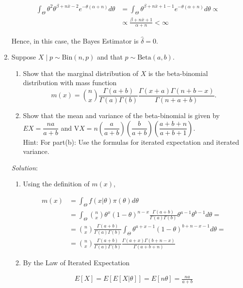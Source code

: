 \documentclass[11pt]{article}
\begin{document}
\begin{enumerate}
\begin{align*}
	\int_{\Theta}{\theta^{2} \theta^{\beta+n\bar{x}-2}e^{-\theta(\alpha+n)} d\theta}	&= \int_{\Theta}{\theta^{\beta+n\bar{x}+1-1}e^{-\theta(\alpha+n)} d\theta} \propto \\
																																										&\propto \frac{\beta+n\bar{x}+1}{\alpha+n} < \infty
\end{align*}

Hence, in this case, the Bayes Estimator is $\hat{\delta} = 0$.

\item Suppose $X\mid p \sim \text{Bin}(n,p)$ and that $p \sim \text{Beta}(a,b).$
\begin{enumerate}
\item Show that the marginal distribution of $X$ is the beta-binomial distribution with mass function 
$$m(x) = {n \choose x} \dfrac{\Gamma(a+b)}{\Gamma(a)\Gamma(b)}
\dfrac{\Gamma(x+a)\Gamma(n+b-x)}{\Gamma(n+a+b)}.
$$
\item Show that the mean and variance of the beta-binomial is given by
$EX = \dfrac{na}{a+b}$ and $\text{V}X = n \left(\dfrac{a}{a+b}\right)\left(\dfrac{b}{a+b}\right)\left(\dfrac{a+b+n}{a+b+1}\right).$\\
Hint: For part(b): Use the formulas for iterated expectation and iterated variance. 
\end{enumerate}

\emph{Solution}:

\begin{enumerate}

\item Using the definition of $m(x)$,

\begin{align*}
m(x)	&= \int_{\Theta}{f(x|\theta)\pi(\theta)d\theta} \\
			&= \int_{\Theta}{{n \choose x}\theta^{x}(1-\theta)^{n-x} \frac{\Gamma(a+b)}{\Gamma(a)\Gamma(b)}\theta^{a-1}\theta^{b-1}d\theta} = \\
			&= {n \choose x}\frac{\Gamma(a+b)}{\Gamma(a)\Gamma(b)} \int_{\Theta}{\theta^{a+x-1}(1-\theta)^{b+n-x-1}d\theta} = \\
			&= {n \choose x}\frac{\Gamma(a+b)}{\Gamma(a)\Gamma(b)} \frac{\Gamma(a+x)\Gamma(b+n-x)}{\Gamma(a+b+n)}
\end{align*}

\item By the Law of Iterated Expectation

\begin{align*}
E[X] = E[E[X|\theta]] = E[n\theta] = \frac{na}{a+b}
\end{align*}


\end{enumerate}
\end{enumerate}
\end{document}
